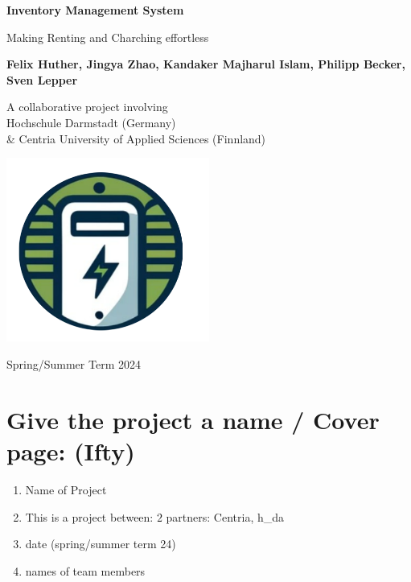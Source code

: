 \begin{titlepage}
    \begin{center}
            
        \Huge
        \textbf{Inventory Management System}
            
        \vspace{0.3cm}
        \Large
        Making Renting and Charching effortless
            
        \vspace{1.0cm}
            
        \textbf{
        Felix Huther,
        Jingya Zhao,
        Kandaker Majharul Islam,
        Philipp Becker,
        Sven Lepper }
          
        \vfill            
        A collaborative project involving\\
        Hochschule Darmstadt (Germany) \\\& Centria University of Applied Sciences (Finnland)

        \vspace{0.5cm}
            
        \includegraphics[width=0.5\textwidth]{images/logo.png}

            
        \Large
      
        Spring/Summer Term 2024
            
    \end{center}
\end{titlepage}

\section{Give the project a name / Cover page: (Ifty)}
\begin{enumerate}
    \item Name of Project
    \item This is a project between: \(2\) partners: Centria, h\_da
    \item date (spring/summer term 24)
    \item names of team members
    
    
\end{enumerate}
